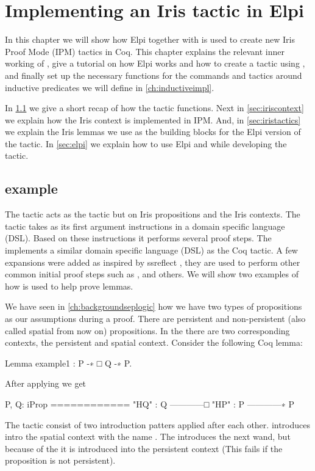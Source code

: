 \documentclass[thesis.tex]{subfiles}
\begin{document}
\VerbatimFootnotes

\chapter{Implementing an Iris tactic in Elpi}
In this chapter we will show how Elpi together with \ce is used to create new Iris Proof Mode (IPM) tactics in Coq.
This chapter explains the relevant inner working of \IPM, give a tutorial on how Elpi works and how to create a tactic using \ce, and finally set up the necessary functions for the commands and tactics around inductive predicates we will define in \cref{ch:inductiveimpl}.

In \cref{sec:introsex} we give a short recap of how the  tactic functions. Next in \cref{sec:iriscontext} we explain how the Iris context is implemented in IPM. And, in \cref{sec:iristactics} we explain the Iris lemmas we use as the building blocks for the Elpi version of the tactic. In \cref{sec:elpi} we explain how to use Elpi and \ce while developing the  tactic.


\section[iIntros example]{ example}\label{sec:introsex}
The \IPM {} tactic acts as the  tactic but on Iris propositions and the Iris contexts. The  tactic takes  as its first argument instructions in a domain specific language (DSL). Based on these instructions it performs several proof steps. The  implements a similar domain specific language (DSL) as the Coq tactic. A few expansions were added as inspired by ssreflect \cite*{huetCoqProofAssistant1997, gonthierSmallScaleReflection2016}, they are used to perform other common initial proof steps such as ,  and others. We will show two examples of how  is used to help prove lemmas.

We have seen in \cref{ch:backgroundseplogic} how we have two types of propositions as our assumptions during a proof. There are persistent and non-persistent (also called spatial from now on) propositions.
In the \IPM there are two corresponding contexts, the persistent and spatial context. Consider the following Coq lemma:
\begin{coqcode}
  Lemma example1 : P -∗ □ Q -∗ P.
\end{coqcode}
After applying  we get
\begin{coqcode}
  P, Q: iProp
  ============
  "HQ" : Q
  ------------□
  "HP" : P
  ------------∗
  P
\end{coqcode}
The tactic  consist of two introduction patters applied after each other.  introduces  intro the spatial context with the name . The  introduces the next wand, but because of the \coqi{#} it is introduced into the persistent context (This fails if the proposition is not persistent).
\end{document}

